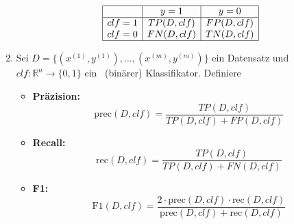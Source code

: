 \begin{enumerate}
\[
\begin{array}{|c|c|c|}
\hline
 & y = 1 & y = 0 \\
\hline
clf = 1 & TP(D, clf) & FP(D, clf) \\
clf = 0 & FN(D, clf) & TN(D, clf) \\
\hline
\end{array}
\]
\item
Sei $D = \{(x^{(1)}, y^{(1)}), \dots, (x^{(m)}, y^{(m)})\}$ ein Datensatz und $clf: \mathbb{R}^n \to \{0, 1\}$ ein ~(binärer) Klassifikator. Definiere
\begin{itemize}
    \item \textbf{Präzision:}
    \begin{equation}
    \text{prec}(D, clf) = \frac{TP(D, clf)}{TP(D, clf) + FP(D, clf)}
     \end{equation}
    \item \textbf{Recall:}
 \begin{equation}
    \text{rec}(D, clf) = \frac{TP(D, clf)}{TP(D, clf) + FN(D, clf)}
    \end{equation}
    \item \textbf{F1:}
    \begin{equation}
    \text{F1}(D, clf) = \frac{2 \cdot \text{prec}(D, clf) \cdot \text{rec}(D, clf)}{\text{prec}(D, clf) + \text{rec}(D, clf)}
    \end{equation}
\end{itemize}
\end{enumerate}